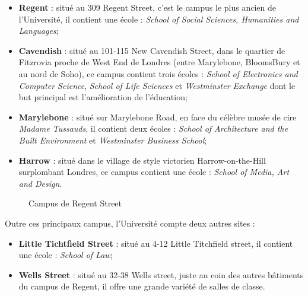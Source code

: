 \begin{itemize}
	\item \textbf{Regent} : situ\'e au 309 Regent Street, c'est le campus le plus ancien de l'Universit\'e, il contient une \'ecole : 
		\textit{School of Social Sciences, Humanities and Languages};

	\item \textbf{Cavendish} : situ\'e au 101-115 New Cavendish Street, dans le quartier de Fitzrovia proche de West End de Londres (entre Marylebone, BloomsBury et au nord de Soho), ce campus contient trois \'ecoles : 
		\textit{School of Electronics and Computer Science}, \textit{School of Life Sciences} et \textit{Westminster Exchange} dont le but principal est l'am\'elioration de l'\'education;

	\item \textbf{Marylebone} : situ\'e sur Marylebone Road, en face du c\'el\`ebre mus\'ee de cire \textit{Madame Tussauds}, il contient deux \'ecoles :
		\textit{School of Architecture and the Built Environment} et \textit{Westminster Business School};

	\item \textbf{Harrow} : situ\'e dans le village de style victorien Harrow-on-the-Hill surplombant Londres, ce campus contient une \'ecole : 
		\textit{School of Media, Art and Design}.

\end{itemize}

\begin{figure}[!ht]
	\centering
	\qquad
	\caption{Campus de Regent Street}

\end{figure}

\noindent Outre ces principaux campus, l'Universit\'e compte deux autres sites : 

\begin{itemize}
	\item \textbf{Little Tichtfield Street} : situ\'e au 4-12 Little Titchfield street, il contient une \'ecole : 
		\textit{School of Law};
	\item \textbf{Wells Street} : situ\'e au 32-38 Wells street, juste au coin des autres b\^atiments du campus de Regent, il offre une grande vari\'et\'e de salles de classe.

\end{itemize}

